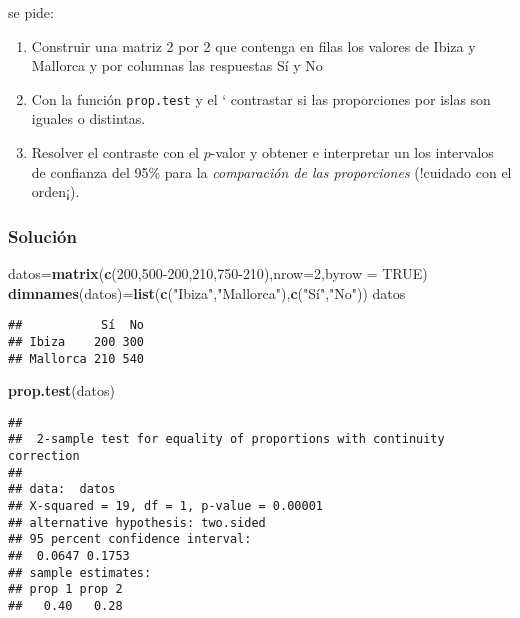 \documentclass[
]{article}
\newenvironment{Shaded}{\begin{snugshade}}{\end{snugshade}}
\newcommand{\DataTypeTok}[1]{\textcolor[rgb]{0.13,0.29,0.53}{#1}}
\newcommand{\DecValTok}[1]{\textcolor[rgb]{0.00,0.00,0.81}{#1}}
\newcommand{\KeywordTok}[1]{\textcolor[rgb]{0.13,0.29,0.53}{\textbf{#1}}}
\newcommand{\NormalTok}[1]{#1}
\newcommand{\OtherTok}[1]{\textcolor[rgb]{0.56,0.35,0.01}{#1}}
\newcommand{\StringTok}[1]{\textcolor[rgb]{0.31,0.60,0.02}{#1}}
\providecommand{\tightlist}{%
  \setlength{\itemsep}{0pt}\setlength{\parskip}{0pt}}
\begin{document}
se pide:

\begin{enumerate}
\def\labelenumi{\arabic{enumi}.}
\tightlist
\item
  Construir una matriz 2 por 2 que contenga en filas los valores de
  Ibiza y Mallorca y por columnas las respuestas Sí y No
\item
  Con la función \texttt{prop.test} y el ` contrastar si las
  proporciones por islas son iguales o distintas.\\
\item
  Resolver el contraste con el \(p\)-valor y obtener e interpretar un
  los intervalos de confianza del 95\% para la \emph{comparación de las
  proporciones} (!cuidado con el orden¡).
\end{enumerate}

\hypertarget{soluciuxf3n-4}{%
\subsubsection{Solución}\label{soluciuxf3n-4}}

\begin{Shaded}
\begin{Highlighting}[]
\NormalTok{datos=}\KeywordTok{matrix}\NormalTok{(}\KeywordTok{c}\NormalTok{(}\DecValTok{200}\NormalTok{,}\DecValTok{500{-}200}\NormalTok{,}\DecValTok{210}\NormalTok{,}\DecValTok{750{-}210}\NormalTok{),}\DataTypeTok{nrow=}\DecValTok{2}\NormalTok{,}\DataTypeTok{byrow =} \OtherTok{TRUE}\NormalTok{)}
\KeywordTok{dimnames}\NormalTok{(datos)=}\KeywordTok{list}\NormalTok{(}\KeywordTok{c}\NormalTok{(}\StringTok{"Ibiza"}\NormalTok{,}\StringTok{"Mallorca"}\NormalTok{),}\KeywordTok{c}\NormalTok{(}\StringTok{"Sí"}\NormalTok{,}\StringTok{"No"}\NormalTok{))}
\NormalTok{datos}
\end{Highlighting}
\end{Shaded}

\begin{verbatim}
##           Sí  No
## Ibiza    200 300
## Mallorca 210 540
\end{verbatim}

\begin{Shaded}
\begin{Highlighting}[]
\KeywordTok{prop.test}\NormalTok{(datos)}
\end{Highlighting}
\end{Shaded}

\begin{verbatim}
## 
##  2-sample test for equality of proportions with continuity correction
## 
## data:  datos
## X-squared = 19, df = 1, p-value = 0.00001
## alternative hypothesis: two.sided
## 95 percent confidence interval:
##  0.0647 0.1753
## sample estimates:
## prop 1 prop 2 
##   0.40   0.28
\end{verbatim}
\end{document}
